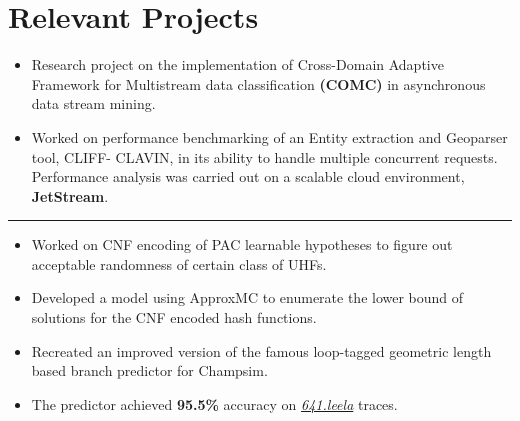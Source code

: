 \documentclass[10pt, margin=0.5in]{deedy-resume-openfont}
\begin{document}
\begin{minipage}[t]{0.48\textwidth}

\vspace{-8pt}
\section{Relevant Projects}


\begin{itemize}[leftmargin=*, noitemsep]
  \item Research project on the implementation of Cross-Domain Adaptive Framework for Multistream data classification \textbf{(COMC)} in asynchronous data stream mining.
  \item Worked on performance benchmarking of an Entity extraction and Geoparser tool, CLIFF-
  CLAVIN, in its ability to handle multiple concurrent requests. Performance analysis was carried 
  out on a scalable cloud environment, \textbf{JetStream}.
\end{itemize}


\vspace{-6pt}
\rule{\textwidth}{0.5pt}	
\vspace{-10pt}


\begin{itemize}[leftmargin=*, noitemsep]
    \item Worked on CNF encoding of PAC learnable hypotheses to figure out acceptable randomness
        of certain class of UHFs.
    \item Developed a model using ApproxMC to enumerate the lower bound of solutions for the CNF encoded
        hash functions.
\end{itemize}

\vspace{5pt}
\begin{itemize}[leftmargin=*, noitemsep]
    \item Recreated an improved version of the famous loop-tagged geometric length based branch predictor for Champsim.
    \item The predictor achieved \textbf{95.5\%} accuracy on \textit{\href{https://www.spec.org/cpu2017/Docs/benchmarks/641.leela_s.html}{641.leela}} traces.
\end{itemize}


\end{minipage}
\end{document}
